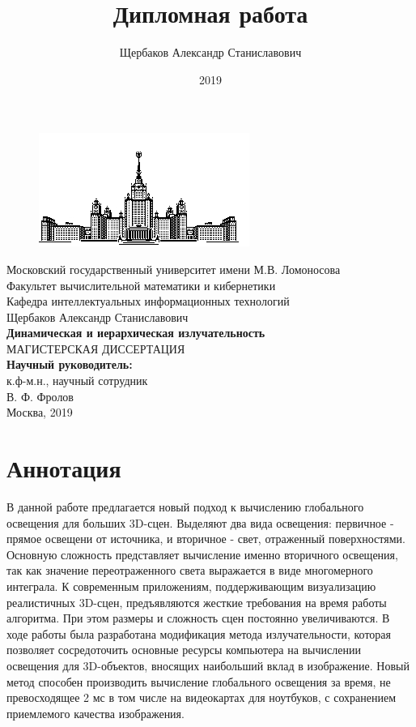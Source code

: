 \documentclass[oneside,final,12pt, a4paper]{extreport}
\newcommand{\sect}[1]{%
  \newpage%
  \section*{#1}%
  \addcontentsline{toc}{section}{#1}}
\begin{document}
\title{Дипломная работа}
\author{Щербаков Александр Станиславович}
\date{2019}
\begin{titlepage}
  \begin{center}
    \begin{figure}[h!]
      \center    
      \includegraphics{title/msu.jpg}
    \end{figure}
    Московский государственный университет имени М.В. Ломоносова\\
    Факультет вычислительной математики и кибернетики\\
    Кафедра интеллектуальных информационных технологий\\
    \vspace{2.3cm}
    {\LARGE Щербаков Александр Станиславович \\
    \vspace{1.24cm}
    \textbf{Динамическая и иерархическая излучательность\\}
    \vspace{2.2cm}
    МАГИСТЕРСКАЯ ДИССЕРТАЦИЯ \\
    }
    \vspace{3.4cm}
    \hfill { \bf Научный руководитель:\\}
    \hfill к.ф-м.н., научный сотрудник\\
    \hfill В. Ф. Фролов \\
    \vfill Москва, 2019
  \end{center}
\end{titlepage}
\pagebreak


\tableofcontents

\sect{Аннотация}

В данной работе предлагается новый подход к вычислению глобального освещения для больших 3D-сцен. Выделяют два вида освещения: первичное - прямое освещени от источника, и вторичное - свет, отраженный поверхностями. Основную сложность представляет вычисление именно вторичного освещения, так как значение переотраженного света выражается в виде многомерного интеграла. К современным приложениям, поддерживающим визуализацию реалистичных 3D-сцен, предъявляются жесткие требования на время работы алгоритма. При этом размеры и сложность сцен постоянно увеличиваются.
В ходе работы была разработана модификация метода излучательности, которая позволяет сосредоточить основные ресурсы компьютера на вычислении освещения для 3D-объектов, вносящих наибольший вклад в изображение. Новый метод способен производить вычисление глобального освещения за время, не превосходящее 2 мс в том числе на видеокартах для ноутбуков, с сохранением приемлемого качества изображения.
\end{document}
